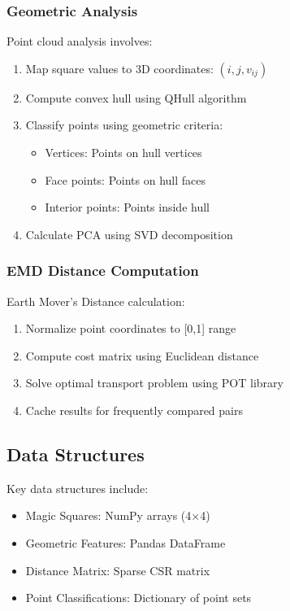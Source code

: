 \documentclass[11pt]{article}
\begin{document}
\subsubsection{Geometric Analysis}
Point cloud analysis involves:
\begin{enumerate}
    \item Map square values to 3D coordinates: $(i, j, v_{ij})$
    \item Compute convex hull using QHull algorithm
    \item Classify points using geometric criteria:
    \begin{itemize}
        \item Vertices: Points on hull vertices
        \item Face points: Points on hull faces
        \item Interior points: Points inside hull
    \end{itemize}
    \item Calculate PCA using SVD decomposition
\end{enumerate}

\subsubsection{EMD Distance Computation}
Earth Mover's Distance calculation:
\begin{enumerate}
    \item Normalize point coordinates to [0,1] range
    \item Compute cost matrix using Euclidean distance
    \item Solve optimal transport problem using POT library
    \item Cache results for frequently compared pairs
\end{enumerate}

\subsection{Data Structures}
Key data structures include:
\begin{itemize}
    \item Magic Squares: NumPy arrays (4×4)
    \item Geometric Features: Pandas DataFrame
    \item Distance Matrix: Sparse CSR matrix
    \item Point Classifications: Dictionary of point sets
\end{itemize}
\end{document}
